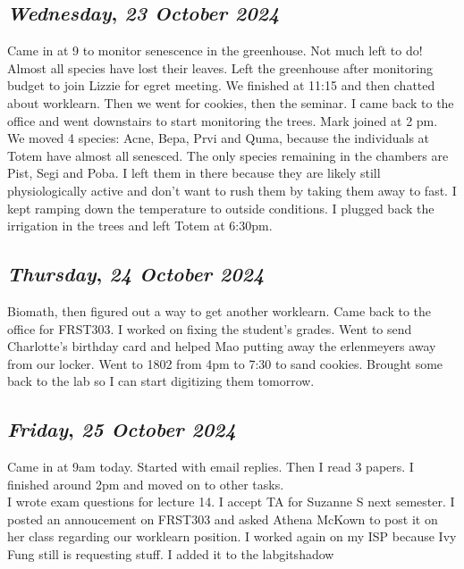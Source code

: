 \def\day{\textit{23 October 2024}}
\def\weekday{\textit{Wednesday}}
\subsection*{\weekday, \day}
Came in at 9 to monitor senescence in the greenhouse. Not much left to do! Almost all species have lost their leaves. Left the greenhouse after monitoring budget to join Lizzie for egret meeting. We finished at 11:15 and then chatted about worklearn. Then we went for cookies, then the seminar. I came back to the office and went downstairs to start monitoring the trees. Mark joined at 2 pm. We moved 4 species: Acne, Bepa, Prvi and Quma, because the individuals at Totem have almost all senesced. The only species remaining in the chambers are Pist, Segi and Poba. I left them in there because they are likely still physiologically active and don't want to rush them by taking them away to fast. I kept ramping down the temperature to outside conditions. I plugged back the irrigation in the trees and left Totem at 6:30pm. 

\def\day{\textit{24 October 2024}}
\def\weekday{\textit{Thursday}}
\subsection*{\weekday, \day}
Biomath, then figured out a way to get another worklearn. Came back to the office for FRST303. I worked on fixing the student's grades. Went to send Charlotte's birthday card and helped Mao putting away the erlenmeyers away from our locker. Went to 1802 from 4pm to 7:30 to sand cookies. Brought some back to the lab so I can start digitizing them tomorrow. 

\def\day{\textit{25 October 2024}}
\def\weekday{\textit{Friday}}
\subsection*{\weekday, \day}
Came in at 9am today. Started with email replies. Then I read 3 papers. I finished around 2pm and moved on to other tasks. \\
I wrote exam questions for lecture 14. I accept TA for Suzanne S next semester. I posted an annoucement on FRST303 and asked Athena McKown to post it on her class regarding our worklearn position. I worked again on my ISP because Ivy Fung still is requesting stuff. I added it to the labgitshadow

\def\day{\textit{26 October 2024}}
\def\weekday{\textit{Saturday}}
